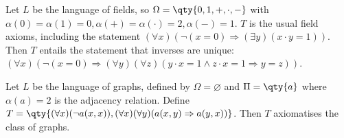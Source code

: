 \begin{example}
    Let $L$ be the language of fields, so $\Omega = \qty{0, 1, +, \cdot, -}$ with $\alpha(0) = \alpha(1) = 0, \alpha(+) = \alpha(\cdot) = 2, \alpha(-) = 1$.
    $T$ is the usual field axioms, including the statement $(\forall x)(\neg (x = 0) \Rightarrow (\exists y)(x \cdot y = 1))$.
    Then $T$ entails the statement that inverses are unique: $(\forall x)(\neg (x = 0) \Rightarrow (\forall y)(\forall z) (y \cdot x = 1 \wedge z \cdot x = 1 \Rightarrow y = z))$.
\end{example}

\begin{example}
    Let $L$ be the language of graphs, defined by $\Omega = \varnothing$ and $\Pi = \qty{a}$ where $\alpha(a) = 2$ is the adjacency relation.
    Define $T = \qty{(\forall x)(\neg a(x,x)), (\forall x)(\forall y)(a(x,y) \Rightarrow a(y,x))}$.
    Then $T$ axiomatises the class of graphs.
\end{example}

